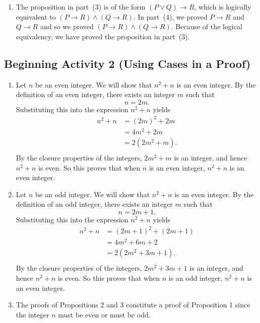 \documentclass[11pt]{article}
\begin{document}
\begin{enumerate}
\item The proposition in part~(3) is of the form $(P \vee Q) \to R$, which is logically equivalent to 
$( {P \to R} ) \wedge ( {Q \to R} )$.  In part~(4), we proved $P \to R$ and $Q \to R$ and so we proved 
$( {P \to R} ) \wedge ( {Q \to R} )$.  Because of the logical equivalency, we have proved the proposition in part~(3).



\end{enumerate}
\hbreak

\newpage
\subsection*{Beginning Activity 2 (Using Cases in a Proof)}

\begin{enumerate}
\item Let  $n$  be an even integer.  We will show that  $n^2  + n$  is an even integer.  By the definition of an even integer, there exists an integer  $m$  such that
\[
n = 2m.
\]
Substituting this into the expression  $n^2  + n$  yields
\[
\begin{aligned}
  n^2  + n &= ( {2m} )^2  + 2m \\ 
           &= 4m^2  + 2m \\ 
           &= 2( {2m^2  + m} ). \\ 
\end{aligned} 
\]
By the closure properties of the integers,  $2m^2  + m$  is an integer, and hence   
$n^2  + n$  is even.  So this proves that  when  $n$  is an even integer, $n^2  + n$  is an even integer. \qedsymbol

\item Let  $n$  be an odd integer.  We will show that  $n^2  + n$  is an even integer.  By the definition of an odd integer, there exists an integer  $m$  such that
\[
n = 2m+1.
\]
Substituting this into the expression  $n^2  + n$  yields
\[
\begin{aligned}
  n^2  + n &= ( {2m + 1} )^2  + ( 2m+1 ) \\ 
           &= 4m^2  + 6m + 2 \\ 
           &= 2( {2m^2  + 3m + 1} ). \\ 
\end{aligned} 
\]
By the closure properties of the integers,  $2m^2  + 3m + 1$  is an integer, and hence   
$n^2  + n$  is even.  So this proves that  when  $n$  is an odd integer, $n^2  + n$  is an even integer. \qedsymbol

\item The proofs of Propositions 2 and 3 constitute a proof of Proposition 1 since the integer $n$ must be even or must be odd.
\end{enumerate}
\hbreak
\end{document}
